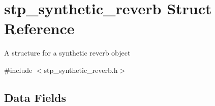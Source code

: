 \hypertarget{structstp__synthetic__reverb}{}\section{stp\+\_\+synthetic\+\_\+reverb Struct Reference}
\label{structstp__synthetic__reverb}


A structure for a synthetic reverb object ~\newline
  




{\ttfamily \#include $<$stp\+\_\+synthetic\+\_\+reverb.\+h$>$}

\subsection*{Data Fields}
